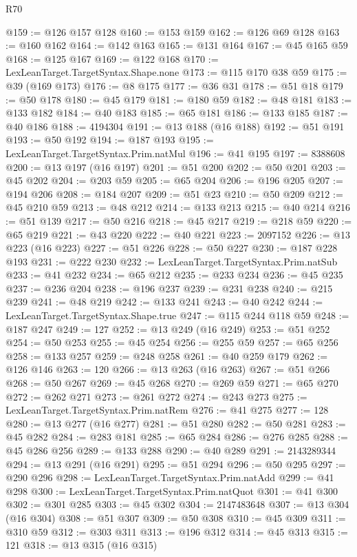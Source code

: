 \begin{lexlean}{R70}
\begin{coremodule}
@159 := @126 @157 @128
@160 := @153 @159
@162 := @126 @69 @128
@163 := @160 @162
@164 := @142 @163
@165 := @131 @164
@167 := @45 @165 @59
@168 := @125 @167
@169 := @122 @168
@170 := LexLeanTarget.TargetSyntax.Shape.none
@173 := @115 @170 @38 @59
@175 := @39 (@169 @173)
@176 := @8 @175
@177 := @36 @31
@178 := @51 @18
@179 := @50 @178
@180 := @45 @179
@181 := @180 @59
@182 := @48 @181
@183 := @133 @182
@184 := @40 @183
@185 := @65 @181
@186 := @133 @185
@187 := @40 @186
@188 := 4194304
@191 := @13 @188 (@16 @188)
@192 := @51 @191
@193 := @50 @192
@194 := @187 @193
@195 := LexLeanTarget.TargetSyntax.Prim.natMul
@196 := @41 @195
@197 := 8388608
@200 := @13 @197 (@16 @197)
@201 := @51 @200
@202 := @50 @201
@203 := @45 @202
@204 := @203 @59
@205 := @65 @204
@206 := @196 @205
@207 := @194 @206
@208 := @184 @207
@209 := @51 @23
@210 := @50 @209
@212 := @45 @210 @59
@213 := @48 @212
@214 := @133 @213
@215 := @40 @214
@216 := @51 @139
@217 := @50 @216
@218 := @45 @217
@219 := @218 @59
@220 := @65 @219
@221 := @43 @220
@222 := @40 @221
@223 := 2097152
@226 := @13 @223 (@16 @223)
@227 := @51 @226
@228 := @50 @227
@230 := @187 @228 @193
@231 := @222 @230
@232 := LexLeanTarget.TargetSyntax.Prim.natSub
@233 := @41 @232
@234 := @65 @212
@235 := @233 @234
@236 := @45 @235
@237 := @236 @204
@238 := @196 @237
@239 := @231 @238
@240 := @215 @239
@241 := @48 @219
@242 := @133 @241
@243 := @40 @242
@244 := LexLeanTarget.TargetSyntax.Shape.true
@247 := @115 @244 @118 @59
@248 := @187 @247
@249 := 127
@252 := @13 @249 (@16 @249)
@253 := @51 @252
@254 := @50 @253
@255 := @45 @254
@256 := @255 @59
@257 := @65 @256
@258 := @133 @257
@259 := @248 @258
@261 := @40 @259 @179
@262 := @126 @146
@263 := 120
@266 := @13 @263 (@16 @263)
@267 := @51 @266
@268 := @50 @267
@269 := @45 @268
@270 := @269 @59
@271 := @65 @270
@272 := @262 @271
@273 := @261 @272
@274 := @243 @273
@275 := LexLeanTarget.TargetSyntax.Prim.natRem
@276 := @41 @275
@277 := 128
@280 := @13 @277 (@16 @277)
@281 := @51 @280
@282 := @50 @281
@283 := @45 @282
@284 := @283 @181
@285 := @65 @284
@286 := @276 @285
@288 := @45 @286 @256
@289 := @133 @288
@290 := @40 @289
@291 := 2143289344
@294 := @13 @291 (@16 @291)
@295 := @51 @294
@296 := @50 @295
@297 := @290 @296
@298 := LexLeanTarget.TargetSyntax.Prim.natAdd
@299 := @41 @298
@300 := LexLeanTarget.TargetSyntax.Prim.natQuot
@301 := @41 @300
@302 := @301 @285
@303 := @45 @302
@304 := 2147483648
@307 := @13 @304 (@16 @304)
@308 := @51 @307
@309 := @50 @308
@310 := @45 @309
@311 := @310 @59
@312 := @303 @311
@313 := @196 @312
@314 := @45 @313
@315 := 121
@318 := @13 @315 (@16 @315)

\end{coremodule}
\end{lexlean}
